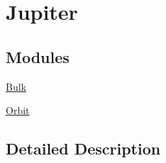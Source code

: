 \hypertarget{group___e_g_x_phys-_constants-_astrophysics-_solar_system-_jupiter}{}\section{Jupiter}
\label{group___e_g_x_phys-_constants-_astrophysics-_solar_system-_jupiter}
\subsection*{Modules}
\begin{DoxyCompactItemize}
\item 
\mbox{\hyperlink{group___e_g_x_phys-_constants-_astrophysics-_solar_system-_jupiter-_bulk}{Bulk}}
\item 
\mbox{\hyperlink{group___e_g_x_phys-_constants-_astrophysics-_solar_system-_jupiter-_orbit}{Orbit}}
\end{DoxyCompactItemize}


\subsection{Detailed Description}
